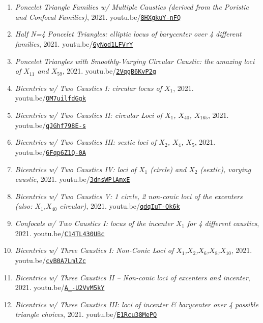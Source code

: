 \documentclass[12pt]{article}
\begin{document}
\begin{enumerate}[resume]
\item \textit{Poncelet Triangle Families w/ Multiple Caustics (derived from the Poristic and Confocal Families)}, 2021. youtu.be/\href{https://youtu.be/8HXgkuY-nFQ}{\nolinkurl{8HXgkuY-nFQ}}
\item \textit{Half N=4 Poncelet Triangles: elliptic locus of barycenter over 4 different families}, 2021. youtu.be/\href{https://youtu.be/6yNod1LFVrY}{\nolinkurl{6yNod1LFVrY}}
\item \textit{Poncelet Triangles with Smoothly-Varying Circular Caustic: the amazing loci of $X_{11}$ and $X_{59}$}, 2021. youtu.be/\href{https://youtu.be/2VqgB6KvP2g}{\nolinkurl{2VqgB6KvP2g}}
\item \textit{Bicentrics w/ Two Caustics I: circular locus of $X_{1}$}, 2021. youtu.be/\href{https://youtu.be/OM7uilfdGgk}{\nolinkurl{OM7uilfdGgk}}
\item \textit{Bicentrics w/ Two Caustics II: circular Loci of $X_{1}$, $X_{40}$, $X_{165}$}, 2021. youtu.be/\href{https://youtu.be/qJGhf798E-s}{\nolinkurl{qJGhf798E-s}}
\item \textit{Bicentrics w/ Two Caustics III: sextic loci of $X_{2}$, $X_{4}$, $X_{5}$}, 2021. youtu.be/\href{https://youtu.be/6Fqp6Z1Q-0A}{\nolinkurl{6Fqp6Z1Q-0A}}
\item \textit{Bicentrics w/ Two Caustics IV: loci of $X_{1}$ (circle) and $X_{2}$ (sextic), varying caustic}, 2021. youtu.be/\href{https://youtu.be/3dnsWPlAmxE}{\nolinkurl{3dnsWPlAmxE}}
\item \textit{Bicentrics w/ Two Caustics V: 1 circle, 2 non-conic loci of the excenters (also: $X_{1}$,$X_{40}$ circular)}, 2021. youtu.be/\href{https://youtu.be/qdqIuT-Qk6k}{\nolinkurl{qdqIuT-Qk6k}}
\item \textit{Confocals w/ Two Caustics I: locus of the incenter $X_{1}$ for 4 different caustics}, 2021. youtu.be/\href{https://youtu.be/C14TL430UBc}{\nolinkurl{C14TL430UBc}}
\item \textit{Bicentrics w/ Three Caustics I: Non-Conic Loci of $X_{1}$,$X_{2}$,$X_{6}$,$X_{8}$,$X_{10}$}, 2021. youtu.be/\href{https://youtu.be/cvB0A7LmlZc}{\nolinkurl{cvB0A7LmlZc}}
\item \textit{Bicentrics w/ Three Caustics II -- Non-conic loci of excenters and  incenter}, 2021. youtu.be/\href{https://youtu.be/A_-U2VvM5kY}{\nolinkurl{A\_-U2VvM5kY}}
\item \textit{Bicentrics w/ Three Caustics III: loci of incenter \& barycenter over 4 possible triangle choices}, 2021. youtu.be/\href{https://youtu.be/E1Rcu38MePQ}{\nolinkurl{E1Rcu38MePQ}}

\end{enumerate}
\end{document}
